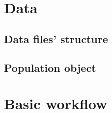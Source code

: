 \documentclass{article}
\begin{document}
\section{Data}
\begin{multicols}{2}
\blindtext
\subsection{Data files' structure}
\blindtext[2]
\subsection{Population object}
\blindtext[3]
\end{multicols}
\newpage
\section{Basic workflow}
\end{document}
